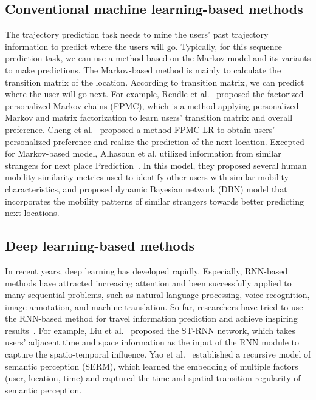 \documentclass[10pt,journal,compsoc]{IEEEtran}
\begin{document}
\subsection{Conventional machine learning-based methods}

The trajectory prediction task needs to mine the users' past trajectory information to predict where the users will go. Typically, for this sequence prediction task, we can use a method based on the Markov model and its variants to make predictions. The Markov-based method is mainly to calculate the transition matrix of the location. According to transition matrix, we can predict where the user will go next. For example, Rendle et al.~\cite{rendle2010factorizing} proposed the factorized personalized Markov chains (FPMC), which is a method applying personalized Markov and matrix factorization to learn users’ transition matrix and overall preference. Cheng et al.~\cite{cheng2013you} proposed a method FPMC-LR to obtain users’ personalized preference and realize the prediction of the next location. Excepted for Markov-based model, Alhasoun et al. utilized information from similar strangers for next place Prediction~\cite{alhasoun2017city}. In this model, they proposed several human mobility similarity metrics used to identify other users with similar mobility characteristics, and proposed dynamic Bayesian network (DBN) model that incorporates the mobility patterns of similar strangers towards better predicting next locations.

\subsection{Deep learning-based methods}
In recent years, deep learning has developed rapidly. Especially, RNN-based methods have attracted increasing attention and been successfully applied to many sequential problems, such as natural language processing, voice recognition, image annotation, and machine translation. So far, researchers have tried to use the RNN-based method for travel information prediction and achieve inspiring results~\cite{liu2016predicting,feng2018deepmove,lan2019travel,sun2020go,zhao2020go}. For example, Liu et al.~\cite{liu2016predicting} proposed the ST-RNN network, which takes users’ adjacent time and space information as the input of the RNN module to capture the spatio-temporal influence. Yao et al.~\cite{yao2017serm} established a recursive model of semantic perception (SERM), which learned the embedding of multiple factors (user, location, time) and captured the time and spatial transition regularity of semantic perception.
\end{document}
